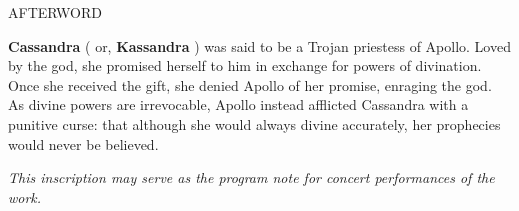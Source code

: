 \documentclass[11pt]{article}
\begin{document}
\vspace*{16\baselineskip}

\begingroup
\begin{center}
\huge AFTERWORD
\end{center}
\endgroup

\vspace*{3\baselineskip}

\begingroup
\textbf{Cassandra} ( or, \textbf{Kassandra} ) was said to be a Trojan priestess of Apollo. Loved by the god, she promised herself to him in exchange for powers of divination. Once she received the gift, she denied Apollo of her promise, enraging the god. As divine powers are irrevocable, Apollo instead afflicted Cassandra with a punitive curse: that although she would always divine accurately, her prophecies would never be believed. 	
\endgroup

\vspace*{45\baselineskip}

\begingroup
\begin{center}
\textit{This inscription may serve as the program note for concert performances of the work.}	
\end{center}
\endgroup
\end{document}

